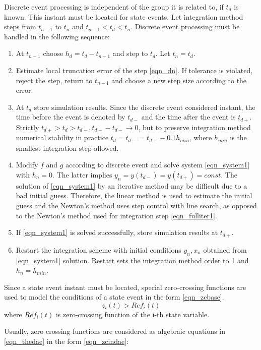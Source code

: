 \documentclass[lettersize,journal]{IEEEtran}
\begin{document}
Discrete event processing is independent of the group it is related to, if \(t_d\) is known. This instant must be located for state events. Let integration method steps from \(t_{n-1}\) to \(t_n\) and \(t_{n-1}<t_d<t_n\). Discrete event processing must be handled in the following sequence:
\begin{enumerate}
	\item At \(t_{n-1}\) choose \(h_d=t_d-t_{n-1}\) and step to \(t_d\). Let \(t_n=t_d\).
	\item Estimate local truncation error of the step \eqref{eqn_dn}. If tolerance is violated, reject the step, return to \(t_{n-1}\) and choose a new step size according to the error.
	\item At \(t_d\) store simulation results. Since the discrete event considered instant, the time before the event is denoted by \(t_{d-}\) and the time after the event is \(t_{d+}\). Strictly \(t_{d+}>t_d>t_{d-},  t_{d+}-t_{d-} \rightarrow 0\), but to preserve integration method numerical stability in practice \(t_d=t_{d-} = t_{d+}-0.1h_{min}\), where \(h_{min}\) is the smallest integration step allowed.
	\item Modify \(f\) and \(g\) according to discrete event and solve system \eqref{eqn_system1} with \(h_n=0\). The latter implies \(y_n=y(t_{d-})=y(t_{d+})=const\). The solution of \eqref{eqn_system1}  by an iterative method may be difficult due to a bad initial guess. Therefore, the linear method is used to estimate the initial guess and the Newton's method uses step control with line search, as opposed to the Newton's method used for integration step \eqref{eqn_fulliter1}.
	\item If \eqref{eqn_system1} is solved successfully, store simulation results at \(t_{d+}\).
	\item Restart the integration scheme with initial conditions \(y_n, x_n\) obtained from \eqref{eqn_system1} solution. Restart sets the integration method order to 1 and \(h_n=h_{min}\).
\end{enumerate}
Since a state event instant must be located, special zero-crossing functions are used to model the conditions of a state event in the form \eqref{eqn_zcbase}.
\begin{equation}
	\label{eqn_zcbase}
	z_i(t) > Ref_i(t)
\end{equation}
\noindent where \(Ref_i(t)\) is zero-crossing function of the i-th state variable.

Usually, zero crossing functions are considered as algebraic equations in \eqref{eqn_thedae} in the form \eqref{eqn_zcindae}:
\end{document}
